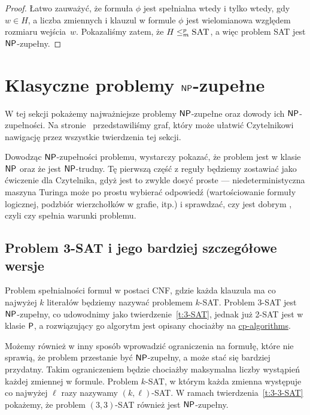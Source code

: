 \begin{proof}
    Łatwo zauważyć, że formuła $\phi$ jest spełnialna wtedy i tylko wtedy, gdy $w \in H$, a liczba zmiennych i klauzul w formule $\phi$ jest wielomianowa względem rozmiaru wejścia~$w$.
    Pokazaliśmy zatem, że $H \leq_m^p \textsc{SAT}$, a więc problem SAT jest $\textsf{NP}$-zupełny.
\end{proof}

\section{Klasyczne problemy $\textsf{NP}$-zupełne}

W tej sekcji pokażemy najważniejsze problemy $\textsf{NP}$-zupełne oraz dowody ich $\textsf{NP}$-zupełności. Na stronie~\pageref{app:graph} przedstawiliśmy graf, który może ułatwić Czytelnikowi nawigację przez wszystkie twierdzenia tej sekcji.

Dowodząc $\textsf{NP}$-zupełności problemu, wystarczy pokazać, że problem jest w klasie $\textsf{NP}$ oraz że jest $\textsf{NP}$-trudny. Tę pierwszą część z reguły będziemy zostawiać jako ćwiczenie dla Czytelnika, gdyż jest to zwykle dosyć proste --- niedeterministyczna maszyna Turinga może po prostu wybierać odpowiedź (wartościowanie formuły logicznej, podzbiór wierzchołków w grafie, itp.) i sprawdzać, czy jest dobrym , czyli czy spełnia warunki problemu.

\subsection{Problem 3-SAT i jego bardziej szczegółowe wersje}

Problem spełnialności formuł w postaci CNF, gdzie każda klauzula ma co najwyżej $k$ literałów będziemy nazywać problemem $k$-SAT\@. Problem 3-SAT jest $\textsf{NP}$-zupełny, co udowodnimy jako twierdzenie~\ref{t:3-SAT}, jednak już 2-SAT jest w klasie $\textsf{P}$, a rozwiązujący go algorytm jest opisany chociażby na \href{https://cp-algorithms.com/graph/2SAT.html}{cp-algorithms}.

Możemy również w inny sposób wprowadzić ograniczenia na formułę, które nie sprawią, że problem przestanie być $\textsf{NP}$-zupełny, a może stać się bardziej przydatny.
Takim ograniczeniem będzie chociażby maksymalna liczby wystąpień każdej zmiennej w formule. Problem $k$-SAT, w którym każda zmienna występuje co najwyżej $\ell$ razy nazywamy $(k, \ell)$-SAT\@. W ramach twierdzenia~\ref{t:3-3-SAT} pokażemy, że problem $(3, 3)$-SAT również jest $\textsf{NP}$-zupełny.

